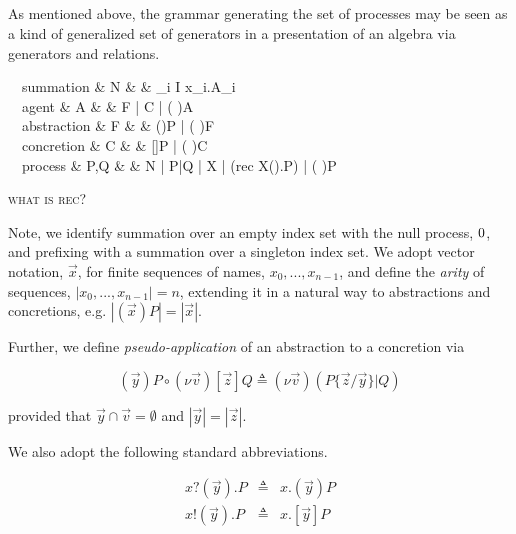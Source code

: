 \documentclass[]{llncs}
\begin{document}
\subsection{\pic}

As mentioned above, the grammar generating the set of processes may be
seen as a kind of generalized set of generators in a presentation of
an algebra via generators and relations.

\begin{grammar}
\mbox{\ \textbullet\ summation} & {N} & \bc &
\Sigma_{i
\in I} x_i.A_i \\
\mbox{\ \textbullet\ agent} & {A} & \bc & F \;| \;
C \;| \; (\nu \; )A \\
\mbox{\ \textbullet\ abstraction} & {F} & \bc &
()P \;| \; (\nu \; )F \\
\mbox{\ \textbullet\ concretion} & {C} & \bc &
[]P \;| \; (\nu \; )C \\
\mbox{\ \textbullet\ process} & {P,Q} & \bc & N
\;| \;P|Q \;| X\langle {} \rangle \;| \; (\textsf{rec} \; X().P)\langle {} \rangle \;| \; (\nu \; )P
\end{grammar} 

\textsc{ what is rec?}

Note, we identify summation over an empty index set with the null
process, $\mathbin{0}$, and prefixing with a summation over a singleton
index set. We adopt vector notation, $\vec{x}$, for finite sequences
of names, $x_0,...,x_{n-1}$, and define the \emph{arity} of sequences,
$|x_0,...,x_{n-1}| = n$, extending it in a natural way to abstractions
and concretions, e.g. $|(\vec{x})P| = |\vec{x}|$.

Further, we define \emph{pseudo-application} of an abstraction to a concretion via

\begin{equation}
  (\vec{y})P \circ (\nu \vec{v})[\vec{z}]Q \triangleq (\nu \vec{v})(P\{\vec{z}/\vec{y}\} | Q)
\end{equation}

provided that $\vec{y} \cap \vec{v} = \emptyset$ and $|\vec{y}| = |\vec{z}|$.

We also adopt the following standard abbreviations.

\begin{eqnarray}
  x?(\vec{y}).P & \triangleq & x.(\vec{y})P \\
  x!(\vec{y}).P & \triangleq & x.[\vec{y}]P
\end{eqnarray}
\end{document}
